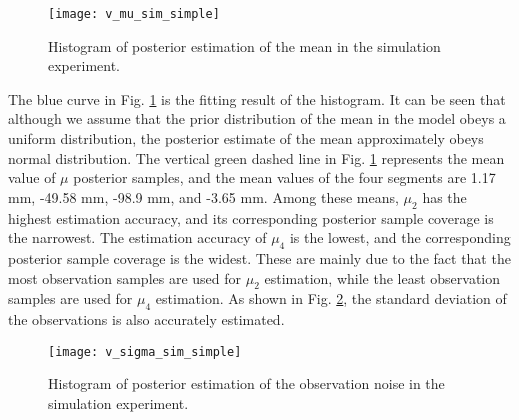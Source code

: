 \documentclass{svjour3}                     %
\begin{document}
\begin{figure}[htbp]
	\centering
	\texttt{[image: v\_mu\_sim\_simple]}
	\caption{Histogram of posterior estimation of the mean in the simulation experiment.}
	\label{fig_v_mu_sim_simple}
\end{figure} 
The blue curve in Fig. \ref{fig_v_mu_sim_simple} is the fitting result of the histogram. It can be seen that although we assume that the prior distribution of the mean in the model obeys a uniform distribution, the posterior estimate of the mean approximately obeys normal distribution. The vertical green dashed line in Fig. \ref{fig_v_mu_sim_simple} represents the mean value of \textbf{$\mu$} posterior samples, and the mean values of the four segments are 1.17 mm, -49.58 mm, -98.9 mm, and -3.65 mm.
Among these means, $\mu_2$ has the highest estimation accuracy, and its corresponding posterior sample coverage is the narrowest. The estimation accuracy of $\mu_4$ is the lowest, and the corresponding posterior sample coverage is the widest. These are mainly due to the fact that the most observation samples are used for $\mu_2$ estimation, while the least observation samples are used for $\mu_4$ estimation. As shown in Fig. \ref{fig_v_sigma_sim_simple}, the standard deviation of the observations is also accurately estimated.

\begin{figure}[htbp]
	\centering
	\texttt{[image: v\_sigma\_sim\_simple]}
	\caption{Histogram of posterior estimation of the observation noise in the simulation experiment.}
	\label{fig_v_sigma_sim_simple}
\end{figure} 
\end{document}
